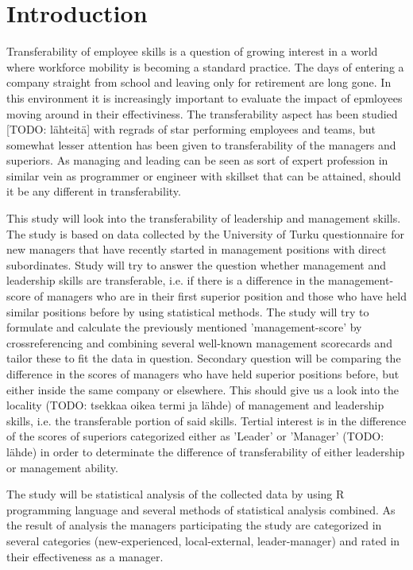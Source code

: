 \section{Introduction}
\label{Introduction}

Transferability of employee skills is a question of growing interest in a world
where workforce mobility is becoming a standard practice. The days of entering a
company straight from school and leaving only for retirement are long gone. In
this environment it is increasingly important to evaluate the impact of
epmloyees moving around in their effectiviness. The transferability aspect has
been studied [TODO: lähteitä] with regrads of star performing employees and
teams, but somewhat lesser attention has been given to transferability of the
managers and superiors. As managing and leading can be seen as sort of expert
profession in similar vein as programmer or engineer with skillset that can be
attained, should it be any different in transferability. 

This study will look into the transferability of leadership and management
skills. The study is based on data collected by the University of Turku
questionnaire for new managers that have recently started in management
positions with direct subordinates. Study will try to answer the question
whether management and leadership skills are transferable, i.e. if there is a
difference in the management-score of managers who are in their first superior
position and those who have held similar positions before by using statistical
methods. The study will try to formulate and calculate the previously mentioned
'management-score' by crossreferencing and combining several well-known
management scorecards and tailor these to fit the data in question. Secondary
question will be comparing the difference in the scores of managers who have
held superior positions before, but either inside the same company or elsewhere.
This should give us a look into the locality (TODO: tsekkaa oikea termi ja
lähde) of management and leadership skills, i.e. the transferable portion of
said skills. Tertial interest is in the difference of the scores of superiors
categorized either as 'Leader' or 'Manager' (TODO: lähde) in order to
determinate the difference of transferability of either leadership or
management ability. 

The study will be statistical analysis of the collected data by using R
programming language and several methods of statistical analysis combined. As
the result of analysis the managers participating the study are categorized in
several categories (new-experienced, local-external, leader-manager) and rated
in their effectiveness as a manager.

